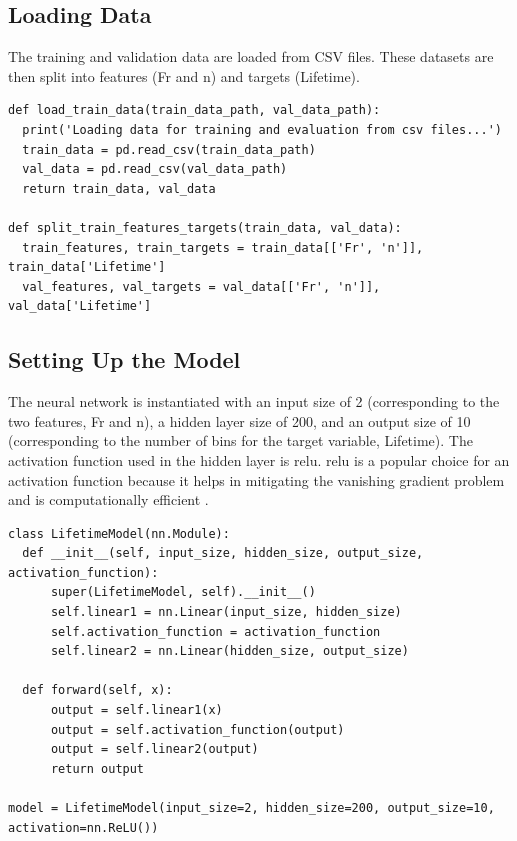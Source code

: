 \subsection*{Loading Data}

The training and validation data are loaded from CSV files. These datasets are then split into features (Fr and n) and targets (Lifetime).

\begin{verbatim}
def load_train_data(train_data_path, val_data_path):
  print('Loading data for training and evaluation from csv files...')
  train_data = pd.read_csv(train_data_path)
  val_data = pd.read_csv(val_data_path)
  return train_data, val_data

def split_train_features_targets(train_data, val_data):
  train_features, train_targets = train_data[['Fr', 'n']], train_data['Lifetime']
  val_features, val_targets = val_data[['Fr', 'n']], val_data['Lifetime']
\end{verbatim}

\subsection*{Setting Up the Model}

The neural network is instantiated with an input size of 2 (corresponding to the two features, Fr and n), a hidden layer size of 200, and an output size of 10 (corresponding to the number of bins for the target variable, Lifetime). The activation function used in the hidden layer is \ac{relu}. \ac{relu} is a popular choice for an activation function because it helps in mitigating the vanishing gradient problem and is computationally efficient \cite[p. 111]{ketkar21}.

\begin{verbatim}
class LifetimeModel(nn.Module):
  def __init__(self, input_size, hidden_size, output_size, activation_function):
      super(LifetimeModel, self).__init__()
      self.linear1 = nn.Linear(input_size, hidden_size)
      self.activation_function = activation_function
      self.linear2 = nn.Linear(hidden_size, output_size)

  def forward(self, x):
      output = self.linear1(x)
      output = self.activation_function(output)
      output = self.linear2(output)
      return output

model = LifetimeModel(input_size=2, hidden_size=200, output_size=10, activation=nn.ReLU())
\end{verbatim}

